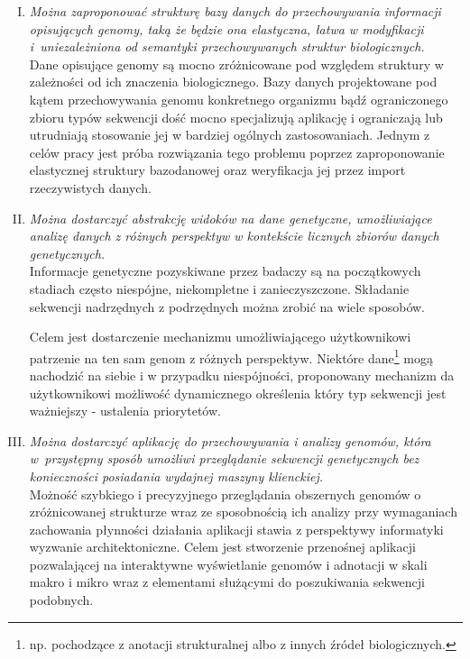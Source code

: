 
\begin{enumerate}[I.]
	\item \textit{
		Można zaproponować strukturę bazy danych do przechowywania informacji opisujących genomy, taką że będzie ona elastyczna, łatwa w modyfikacji i~uniezależniona od semantyki przechowywanych struktur biologicznych.
		} \\
	\break
	Dane opisujące genomy są mocno zróżnicowane pod względem struktury w zależności od ich znaczenia biologicznego. Bazy danych projektowane pod kątem przechowywania genomu konkretnego organizmu bądź ograniczonego zbioru typów sekwencji dość mocno specjalizują aplikację i ograniczają lub utrudniają stosowanie jej w bardziej ogólnych zastosowaniach. Jednym z celów pracy jest próba rozwiązania tego problemu poprzez zaproponowanie elastycznej struktury bazodanowej oraz weryfikacja jej przez import rzeczywistych danych.\\
	
	\item \textit{
		Można dostarczyć abstrakcję widoków na dane genetyczne, umożliwiające analizę danych z różnych perspektyw w kontekście licznych zbiorów
		danych genetycznych.
		} \\
	\break
	Informacje genetyczne pozyskiwane przez badaczy są na początkowych stadiach często niespójne, niekompletne i zanieczyszczone. 
	Składanie sekwencji nadrzędnych z podrzędnych można zrobić na wiele sposobów. 

	Celem jest dostarczenie mechanizmu umożliwiającego użytkownikowi patrzenie na ten sam genom z różnych perspektyw. 
	Niektóre dane\footnote{np. pochodzące z anotacji strukturalnej albo z innych źródeł biologicznych.} mogą nachodzić na siebie i w przypadku niespójności, proponowany mechanizm da użytkownikowi możliwość dynamicznego określenia który typ sekwencji jest ważniejszy - ustalenia priorytetów. \break
	
	\item \textit{
		Można dostarczyć aplikację do przechowywania i analizy genomów, która w~przystępny sposób umożliwi przeglądanie sekwencji genetycznych bez konieczności posiadania wydajnej maszyny klienckiej. 
		} \\
		\break
	Możność szybkiego i precyzyjnego przeglądania obszernych genomów o zróżnicowanej strukturze wraz ze sposobnością ich analizy przy wymaganiach zachowania płynności działania aplikacji stawia z perspektywy informatyki wyzwanie architektoniczne. Celem jest stworzenie przenośnej aplikacji pozwalającej na interaktywne wyświetlanie genomów i adnotacji w skali makro i mikro wraz z elementami służącymi do poszukiwania sekwencji podobnych.
	
\end{enumerate}

